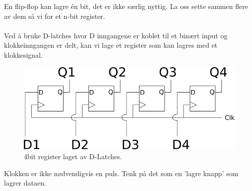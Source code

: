 En flip-flop kan lagre én bit, det er ikke særlig nyttig.
La oss sette sammen flere av dem så vi for et n-bit register.
\\\\
Ved å bruke D-latches hvor D inngangene er koblet til et binært input og
klokkeinngangen er delt, kan vi lage et register som kan lagres med
et klokkesignal.
\begin{figure}[H]
  \caption{4bit register laget av D-Latches.}
  \centering
  \includegraphics[width=\textwidth]{./img/register}
\end{figure}
Klokken er ikke nødvendigvis en puls.
Tenk på det som en 'lagre knapp' som lagrer dataen.
